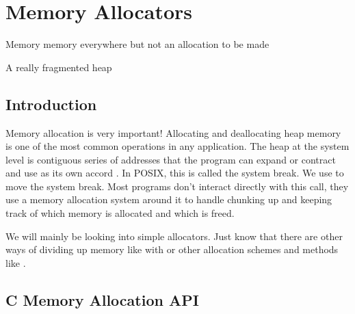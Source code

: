 \chapter{Memory Allocators}

\epigraph{Memory memory everywhere but not an allocation to be made}{A really fragmented heap}

\section{Introduction}

Memory allocation is very important!
Allocating and deallocating heap memory is one of the most common operations in any application.
The heap at the system level is contiguous series of addresses that the program can expand or contract and use as its own accord \cite{mallocinternals}.
In POSIX, this is called the system break.
We use  to move the system break.
Most programs don't interact directly with this call, they use a memory allocation system around it to handle chunking up and keeping track of which memory is allocated and which is freed.

We will mainly be looking into simple allocators.
Just know that there are other ways of dividing up memory like with  or other allocation schemes and methods like .

\section{C Memory Allocation API}


